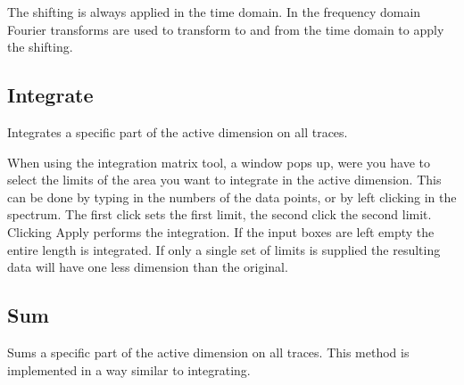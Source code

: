 \documentclass[11pt,a4paper]{article}
\begin{document}
The shifting is always applied in the time domain.
In the frequency domain Fourier transforms are used to transform to and from the time domain to apply the shifting.

\subsection{Integrate}
Integrates a specific part of the active dimension on all traces.


When using the integration matrix tool, a window pops up, were you have to select the limits of the area you want to integrate in the active dimension.
This can be done by typing in the numbers of the data points, or  by left clicking in the spectrum.
The first click sets the first limit, the second click the second limit.
Clicking Apply performs the integration.
If the input boxes are left empty the entire length is integrated.
If only a single set of limits is supplied the resulting data will have one less dimension than the original.


\subsection{Sum}
Sums a specific part of the active dimension on all traces.
This method is implemented in a way similar to integrating.
\end{document}
